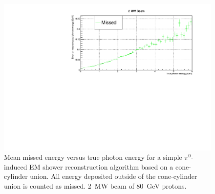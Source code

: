 \documentclass[a4paper]{article}
\begin{document}
\begin{figure}[tbp]
	\centering
	\includegraphics[width=\textwidth]{Figures/2MW/missed_abs_x}
	\caption[Pile-up study mean missed vs.\ true photon energy, \SI{2}{\mega\watt} beam]{%
		Mean missed energy versus true photon energy for a simple $\pi^0$-induced EM shower reconstruction algorithm based on a cone-cylinder union.
		All energy deposited outside of the cone-cylinder union is counted as missed.
		\SI{2}{\mega\watt} beam of \SI{80}{\giga\electronvolt} protons.
	}
	\label{fig:dune-nd_2MW_missed-abs-x}
\end{figure}
\end{document}
